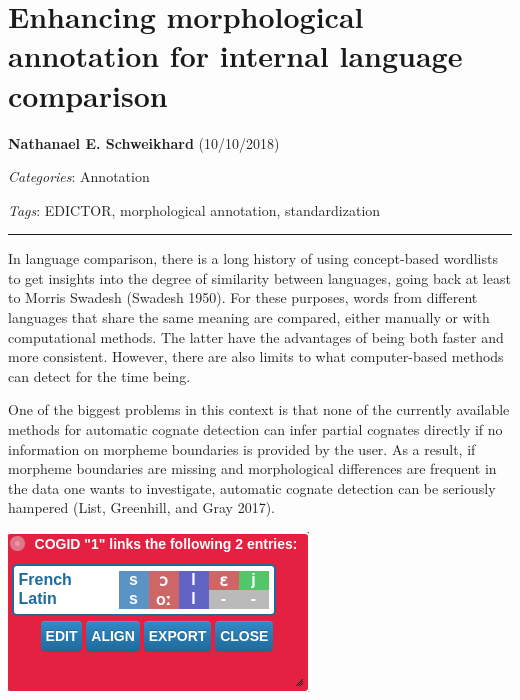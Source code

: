 \documentclass[
  english,
  a4paper,
  oneside,tablecaptionabove
]{scrbook}
\begin{document}
\hypertarget{enhancing-morphological-annotation-for-internal-language-comparison}{%
\chapter{Enhancing morphological annotation for internal language
comparison}\label{enhancing-morphological-annotation-for-internal-language-comparison}}

\textbf{Nathanael E. Schweikhard} (10/10/2018)

\emph{Categories}: Annotation

\emph{Tags}: EDICTOR, morphological annotation, standardization

\begin{center}\rule{0.5\linewidth}{\linethickness}\end{center}

In language {comparison,} there is a long history of using concept-based
wordlists to get insights into the degree of similarity between
languages, going back at least to Morris Swadesh (Swadesh 1950). For
these purposes, words from different languages that share the same
meaning are compared, either manually or with computational methods. The
latter have the advantages of being both faster and more consistent.
However, there are also limits to what computer-based methods can detect
for the time being.

One of the biggest problems in this context is that none of the
currently available methods for automatic cognate detection can infer
partial cognates directly if no information on morpheme boundaries is
provided by the user. As a result, if morpheme boundaries are missing
and morphological differences are frequent in the data one wants to
investigate, automatic cognate detection can be seriously hampered
(List, Greenhill, and Gray 2017).

\begin{center}
\includegraphics{images/__f.hypotheses.org_wp-content_blogs.dir_4500_files_2018_10_Graphik1.png}
\end{center}
\end{document}
